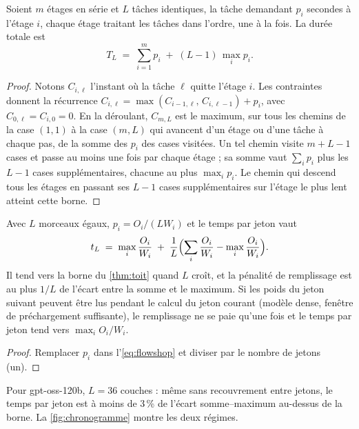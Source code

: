 \begin{lemme}\label{lem:flowshop}
Soient $m$ étages en série et $L$ tâches identiques, la tâche demandant $p_i$ secondes à l'étage $i$, chaque étage traitant les tâches dans l'ordre, une à la fois. La durée totale est
\begin{equation}\label{eq:flowshop}
T_L \;=\; \sum_{i=1}^{m} p_i \;+\; (L - 1)\, \max_i p_i .
\end{equation}
\end{lemme}

\begin{proof}
Notons $C_{i,\ell}$ l'instant où la tâche $\ell$ quitte l'étage $i$. Les contraintes donnent la récurrence $C_{i,\ell} = \max(C_{i-1,\ell},\, C_{i,\ell-1}) + p_i$, avec $C_{0,\ell} = C_{i,0} = 0$. En la déroulant, $C_{m,L}$ est le maximum, sur tous les chemins de la case $(1,1)$ à la case $(m,L)$ qui avancent d'un étage ou d'une tâche à chaque pas, de la somme des $p_i$ des cases visitées. Un tel chemin visite $m + L - 1$ cases et passe au moins une fois par chaque étage ; sa somme vaut $\sum_i p_i$ plus les $L-1$ cases supplémentaires, chacune au plus $\max_i p_i$. Le chemin qui descend tous les étages en passant ses $L-1$ cases supplémentaires sur l'étage le plus lent atteint cette borne.
\end{proof}

\begin{corollaire}\label{cor:permanent}
Avec $L$ morceaux égaux, $p_i = O_i / (L W_i)$ et le temps par jeton vaut
\begin{equation}\label{eq:permanent}
t_L \;=\; \max_i \frac{O_i}{W_i} \;+\; \frac{1}{L} \Bigl( \sum_i \frac{O_i}{W_i} - \max_i \frac{O_i}{W_i} \Bigr).
\end{equation}
Il tend vers la borne du \cref{thm:toit} quand $L$ croît, et la pénalité de remplissage est au plus $1/L$ de l'écart entre la somme et le maximum. Si les poids du jeton suivant peuvent être lus pendant le calcul du jeton courant (modèle dense, fenêtre de préchargement suffisante), le remplissage ne se paie qu'une fois et le temps par jeton tend vers $\max_i O_i/W_i$.
\end{corollaire}

\begin{proof}
Remplacer $p_i$ dans l'\cref{eq:flowshop} et diviser par le nombre de jetons (un).
\end{proof}

Pour gpt-oss-120b, $L = 36$ couches : même sans recouvrement entre jetons, le temps par jeton est à moins de 3\,\% de l'écart somme--maximum au-dessus de la borne. La \cref{fig:chronogramme} montre les deux régimes.

